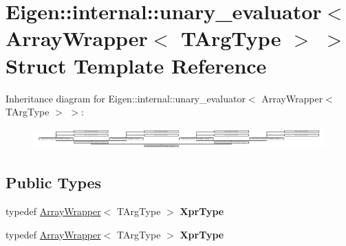 \hypertarget{struct_eigen_1_1internal_1_1unary__evaluator_3_01_array_wrapper_3_01_t_arg_type_01_4_01_4}{}\section{Eigen\+:\+:internal\+:\+:unary\+\_\+evaluator$<$ Array\+Wrapper$<$ T\+Arg\+Type $>$ $>$ Struct Template Reference}
\label{struct_eigen_1_1internal_1_1unary__evaluator_3_01_array_wrapper_3_01_t_arg_type_01_4_01_4}
Inheritance diagram for Eigen\+:\+:internal\+:\+:unary\+\_\+evaluator$<$ Array\+Wrapper$<$ T\+Arg\+Type $>$ $>$\+:\begin{figure}[H]
\begin{center}
\leavevmode
\includegraphics[height=0.808314cm]{struct_eigen_1_1internal_1_1unary__evaluator_3_01_array_wrapper_3_01_t_arg_type_01_4_01_4}
\end{center}
\end{figure}
\subsection*{Public Types}
\begin{DoxyCompactItemize}
\item 
\mbox{\label{struct_eigen_1_1internal_1_1unary__evaluator_3_01_array_wrapper_3_01_t_arg_type_01_4_01_4_a71639b3cf31f6c78b2f42ab7d7b0fa57}} 
typedef \hyperlink{group___core___module_class_eigen_1_1_array_wrapper}{Array\+Wrapper}$<$ T\+Arg\+Type $>$ {\bfseries Xpr\+Type}
\item 
\mbox{\label{struct_eigen_1_1internal_1_1unary__evaluator_3_01_array_wrapper_3_01_t_arg_type_01_4_01_4_a71639b3cf31f6c78b2f42ab7d7b0fa57}} 
typedef \hyperlink{group___core___module_class_eigen_1_1_array_wrapper}{Array\+Wrapper}$<$ T\+Arg\+Type $>$ {\bfseries Xpr\+Type}
\end{DoxyCompactItemize}
